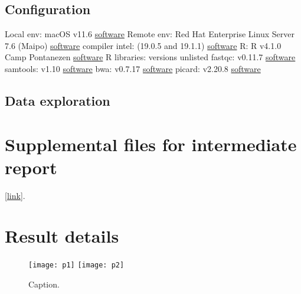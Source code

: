 \markdownRendererUlEndTight \markdownRendererInterblockSeparator
{}\subsection{Configuration}\markdownRendererInterblockSeparator
{}\markdownRendererUlBeginTight
\markdownRendererUlItem Local env: macOS v11.6 \href{https://support.apple.com/macos}{software}\markdownRendererUlItemEnd 
\markdownRendererUlItem Remote env: Red Hat Enterprise Linux Server 7.6 (Maipo) \href{https://www.redhat.com/en/technologies/linux-platforms/enterprise-linux}{software}\markdownRendererUlItemEnd 
\markdownRendererUlItem compiler intel: (19.0.5 and 19.1.1) \href{https://www.intel.com/content/www/us/en/developer/tools/oneapi/commercial-base-hpc.html#gs.ppyt3x}{software}\markdownRendererUlItemEnd 
\markdownRendererUlItem R: R v4.1.0 Camp Pontanezen \href{https://www.r-project.org}{software}\markdownRendererUlItemEnd 
\markdownRendererUlItem R libraries: versions unlisted\markdownRendererUlItemEnd 
\markdownRendererUlItem fastqc: v0.11.7 \href{https://www.bioinformatics.babraham.ac.uk/projects/fastqc/}{software}\markdownRendererUlItemEnd 
\markdownRendererUlItem samtools: v1.10 \href{https://www.htslib.org}{software}\markdownRendererUlItemEnd 
\markdownRendererUlItem bwa: v0.7.17 \href{https://janis.readthedocs.io/en/latest/tools/bioinformatics/bwa/bwamem.html}{software}\markdownRendererUlItemEnd 
\markdownRendererUlItem picard: v2.20.8 \href{http://broadinstitute.github.io/picard/}{software}\markdownRendererUlItemEnd 
\markdownRendererUlEndTight \markdownRendererInterblockSeparator
{}\subsection{Data exploration}\markdownRendererInterblockSeparator
{}\section{Supplemental files for intermediate report} [\href{https://github.com/DylanLawless/kit_assess/data/processed/}{link}].\markdownRendererInterblockSeparator
{}\section{Result details}\markdownRendererInterblockSeparator
{}\begin{figure}[ht] \hspace*{0cm} \begin{center} \texttt{[image: p1]} \texttt{[image: p2]} \caption{Caption.} \label{fig:p1p2} \end{center} \end{figure}\markdownRendererInterblockSeparator

